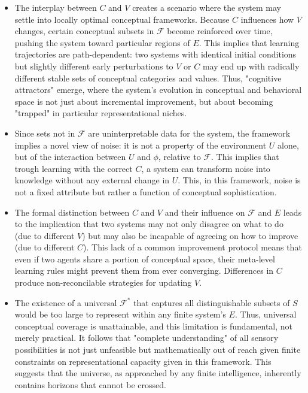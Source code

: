 \documentclass[]{article}
\begin{document}
\begin{itemize}
	\item The interplay between $C$ and $V$ creates a scenario where the system may settle into locally optimal conceptual frameworks. Because $C$ influences how $V$ changes, certain conceptual subsets in $\mathcal{F}$ become reinforced over time, pushing the system toward particular regions of $E$. This implies that learning trajectories are path-dependent: two systems with identical initial conditions but slightly different early perturbations to $V$ or $C$ may end up with radically different stable sets of conceptual categories and values. Thus, "cognitive attractors" emerge, where the system’s evolution in conceptual and behavioral space is not just about incremental improvement, but about becoming "trapped" in particular representational niches.
	\item Since sets not in $\mathcal{F}$ are uninterpretable data for the system, the framework implies a novel view of noise: it is not a property of the environment $U$ alone, but of the interaction between $U$ and $\phi$, relative to $\mathcal{F}$. This implies that trough learning with the correct $C$, a system can transform noise into knowledge without any external change in $U$. This, in this framework, noise is not a fixed attribute but rather a function of conceptual sophistication.
	\item The formal distinction between $C$ and $V$ and their influence on $\mathcal{F}$ and $E$ leads to the implication that two systems may not only disagree on what to do (due to different $V$) but may also be incapable of agreeing on how to improve (due to different $C$). This lack of a common improvement protocol means that even if two agents share a portion of conceptual space, their meta-level learning rules might prevent them from ever converging. Differences in $C$ produce non-reconcilable strategies for updating $V$.
	\item The existence of a universal $\mathcal{F}^*$ that captures all distinguishable subsets of $S$ would be too large to represent within any finite system's $E$. Thus, universal conceptual coverage is unattainable, and this limitation is fundamental, not merely practical. It follows that "complete understanding" of all sensory possibilities is not just unfeasible but mathematically out of reach given finite constraints on representational capacity given in this framework. This suggests that the universe, as approached by any finite intelligence, inherently contains horizons that cannot be crossed.
\end{itemize}
\end{document}
